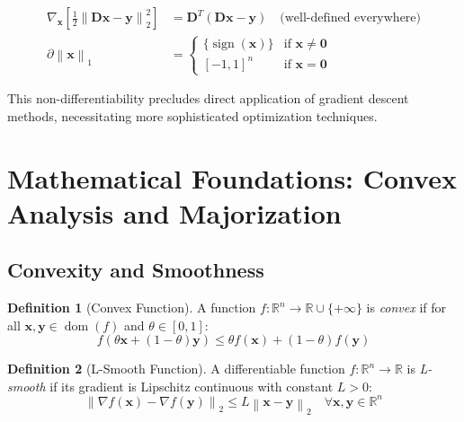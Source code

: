 \documentclass[12pt]{article}
\renewcommand{\vec}[1]{\mathbf{#1}}
\DeclareMathOperator{\sign}{sign}
\newcommand{\norm}[1]{\left\lVert#1\right\rVert}
\newcommand{\R}{\mathbb{R}}
\theoremstyle{definition}
\newtheorem{definition}{Definition}[section]
\begin{document}
\begin{align}
    \nabla_{\vec{x}} \left[\frac{1}{2}\norm{\vec{D}\vec{x} - \vec{y}}_2^2\right] & = \vec{D}^T(\vec{D}\vec{x} - \vec{y}) \quad \text{(well-defined everywhere)} \\
    \partial \norm{\vec{x}}_1                                                    & = \begin{cases}
                                                                                         \{\sign(\vec{x})\} & \text{if } \vec{x} \neq \vec{0} \\
                                                                                         [-1,1]^n           & \text{if } \vec{x} = \vec{0}
                                                                                     \end{cases}
\end{align}


This non-differentiability precludes direct application of gradient descent methods, necessitating more sophisticated optimization techniques.

\newpage
\section{Mathematical Foundations: Convex Analysis and Majorization}

\subsection{Convexity and Smoothness}

\begin{definition}[Convex Function]
    A function $f: \R^n \to \R \cup \{+\infty\}$ is \textit{convex} if for all $\vec{x}, \vec{y} \in \operatorname{dom}(f)$ and $\theta \in [0,1]$:
    \begin{equation}
        f(\theta\vec{x} + (1-\theta)\vec{y}) \leq \theta f(\vec{x}) + (1-\theta)f(\vec{y})
    \end{equation}
\end{definition}

\begin{definition}[L-Smooth Function]
    A differentiable function $f: \R^n \to \R$ is \textit{L-smooth} if its gradient is Lipschitz continuous with constant $L > 0$:
    \begin{equation}
        \norm{\nabla f(\vec{x}) - \nabla f(\vec{y})}_2 \leq L\norm{\vec{x} - \vec{y}}_2 \quad \forall \vec{x}, \vec{y} \in \R^n
    \end{equation}
\end{definition}
\end{document}
